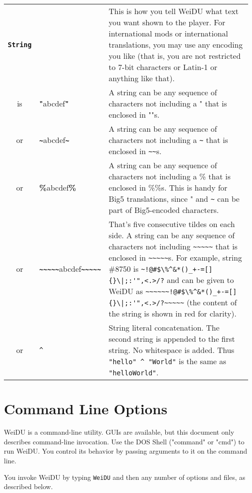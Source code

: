 \documentclass{article}
\def\ttref#1{\ahrefloc{#1}{\tt #1}}
\def\DEFINE#1{{\tt \bf #1}\label{#1}\index{#1}}
\def\t#1{{\tt #1}}
\begin{document}
\begin{tabular}{cp{10in}|p{10in}}
\DEFINE{String} & & This is how you tell WeiDU what text you want shown
to the player. For international mods or international translations, you
may use any encoding you like (that is, you are not restricted to 7-bit
characters or Latin-1 or anything like that). \\
is & {\bf{"}}abcdef{\bf{"}} & A string can be any sequence of characters not
including a " that is enclosed in ""s. \\
or & {\bf{\verb+~+}}abcdef{\bf\verb+~+} & A string can be any sequence of
characters not including a \verb+~+ that is enclosed in
{\verb+~+\verb+~+}s. \\
or & {\bf{\%}}abcdef{\bf{\%}} & A string can be any sequence of characters not
including a \% that is enclosed in \%\%s. This is handy for Big5
translations, since " and \verb+~+ can be part of Big5-encoded characters.
\\
or & {\bf{\verb+~~~~~+}}abcdef{\bf\verb+~~~~~+} & That's five consecutive
tildes on each side. A string can be any
sequence of characters not including \verb+~~~~~+ that is enclosed in
{\verb+~~~~~+}s. For example,
string \#8750 is
{\color{red}\verb`~!@#$\%^&*()_+-=[]{}\|;:'",<.>/?`}
and can be given to WeiDU as
{\verb+~~~~~+}{\color{red}\verb`~!@#$\%^&*()_+-=[]{}\|;:'",<.>/?`}{\verb+~~~~~+}
 (the content of the string is shown in red for clarity).
\\
or & \ttref{String} \t{\^{ }} \ttref{String} & String literal concatenation.
The second string is appended to the first string. No whitespace is added.
Thus \t{"hello" \^{ } "World"} is the same as \t{"helloWorld"}.

\\

\end{tabular}

\section{Command Line Options}

WeiDU is a command-line utility. GUIs are available, but this document only
describes command-line invocation. Use the DOS Shell ("command" or "cmd")
to run WeiDU. You control its behavior by passing arguments to it on the
command line.

You invoke WeiDU by typing {\tt WeiDU} and then any number of options and
files, as described below.
\end{document}
